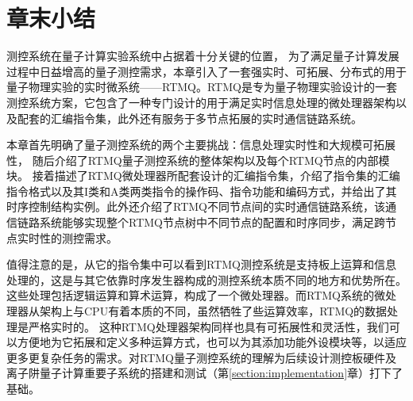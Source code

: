 




\section[章末小结]{章末小结}

测控系统在量子计算实验系统中占据着十分关键的位置，
为了满足量子计算发展过程中日益增高的量子测控需求，本章引入了一套强实时、可拓展、分布式的用于量子物理实验的实时微系统——RTMQ。RTMQ是专为量子物理实验设计的一套测控系统方案，它包含了一种专门设计的用于满足实时信息处理的微处理器架构以及配套的汇编指令集，此外还有服务于多节点拓展的实时通信链路系统。

本章首先明确了量子测控系统的两个主要挑战：信息处理实时性和大规模可拓展性，
随后介绍了RTMQ量子测控系统的整体架构以及每个RTMQ节点的内部模块。
接着描述了RTMQ微处理器所配套设计的汇编指令集，介绍了指令集的汇编指令格式以及其I类和A类两类指令的操作码、指令功能和编码方式，并给出了其时序控制结构实例。此外还介绍了RTMQ不同节点间的实时通信链路系统，该通信链路系统能够实现整个RTMQ节点树中不同节点的配置和时序同步，满足跨节点实时性的测控需求。

值得注意的是，从它的指令集中可以看到RTMQ测控系统是支持板上运算和信息处理的，这是与其它依靠时序发生器构成的测控系统本质不同的地方和优势所在。这些处理包括逻辑运算和算术运算，构成了一个微处理器。而RTMQ系统的微处理器从架构上与CPU有着本质的不同，虽然牺牲了些运算效率，RTMQ的数据处理是严格实时的。
这种RTMQ处理器架构同样也具有可拓展性和灵活性，我们可以方便地为它拓展和定义多种运算方式，也可以为其添加功能外设模块等，以适应更多更复杂任务的需求。对RTMQ量子测控系统的理解为后续设计测控板硬件及离子阱量子计算重要子系统的搭建和测试（第\ref{section:implementation}章）打下了基础。
